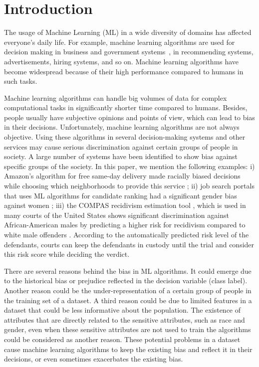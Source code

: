 \section{Introduction}

The usage of Machine Learning (ML) in a wide diversity of domains has affected everyone's daily life. For example, machine learning algorithms are used for decision making in business and government systems~\cite{rudin2019stop}, in recommending systems, advertisements, hiring systems, and so on. Machine learning algorithms have become widespread because of their high performance compared to humans in such tasks. 

Machine learning algorithms can handle big volumes of data for complex computational tasks in significantly shorter time compared to humans. Besides, people usually have subjective opinions and points of view, which can lead to bias in their decisions. 
Unfortunately, machine learning algorithms are not always objective. Using these algorithms in several decision-making systems and other services may cause serious discrimination against certain groups of people in society. A large number of systems have been identified to show bias against specific groups of the society. In this paper, we mention the following examples:  i) Amazon's algorithm for free same-day delivery made racially biased decisions while choosing which neighborhoods to provide this service \cite{soper_2016,letzter_2016}; ii) job search portals that uses ML algorithms for candidate ranking had a significant gender bias against women \cite{lahoti2019ifair}; iii) the COMPAS recidivism estimation tool \cite{compas}, which is used in many courts of the United States shows significant discrimination against African-American males by predicting a higher risk for recidivism compared to white male offenders \cite{propublica}. According to the automatically predicted risk level of the defendants, courts can keep the defendants in custody until the trial and consider this risk score while deciding the verdict. 







There are several reasons behind the bias in ML algorithms. It could emerge due to the historical bias or prejudice reflected in the decision variable (class label). Another reason could be the under-representation of a certain group of people in the training set of a dataset. A third reason could be due to limited features in a dataset that could be less informative about the population. The existence of attributes that are directly related to the sensitive attributes, such as race and gender, even when these sensitive attributes are not used to train the algorithms could be considered as another reason. These potential problems in a dataset cause machine learning algorithms to keep the existing bias and reflect it in their decisions, or even sometimes exacerbates the existing bias.


